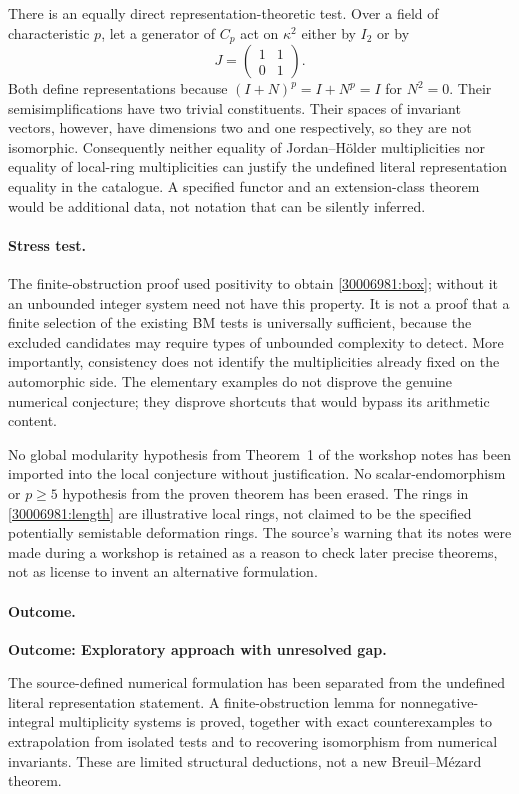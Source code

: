 \documentclass[11pt,a4paper]{article}
\numberwithin{equation}{section}
\begin{document}
There is an equally direct representation-theoretic test. Over a field
of characteristic $p$, let a generator of $C_p$ act on $\kappa^2$
either by $I_2$ or by
\[
 J=\begin{pmatrix}1&1\\0&1\end{pmatrix}.
\]
Both define representations because $(I+N)^p=I+N^p=I$ for $N^2=0$.
Their semisimplifications have two trivial constituents. Their spaces
of invariant vectors, however, have dimensions two and one respectively,
so they are not isomorphic. Consequently neither equality of
Jordan--H\"older multiplicities nor equality of local-ring multiplicities
can justify the undefined literal representation equality in the
catalogue. A specified functor and an extension-class theorem would be
additional data, not notation that can be silently inferred.

\paragraph{Stress test.}
The finite-obstruction proof used positivity to obtain
\eqref{30006981:box}; without it an unbounded integer system need not have
this property. It is not a proof that a finite selection of the existing
BM tests is universally sufficient, because the excluded candidates may
require types of unbounded complexity to detect. More importantly,
consistency does not identify the multiplicities already fixed on the
automorphic side. The elementary examples do not disprove the genuine
numerical conjecture; they disprove shortcuts that would bypass its
arithmetic content.

No global modularity hypothesis from Theorem~1 of the workshop notes
has been imported into the local conjecture without justification.
No scalar-endomorphism or $p\ge5$ hypothesis from the proven theorem
has been erased. The rings in \eqref{30006981:length} are illustrative local
rings, not claimed to be the specified potentially semistable
deformation rings. The source's warning that its notes were made during
a workshop is retained as a reason to check later precise theorems,
not as license to invent an alternative formulation.

\paragraph{Outcome.}
\textbf{Outcome: Exploratory approach with unresolved gap.}

The source-defined numerical formulation has been separated from the
undefined literal representation statement. A finite-obstruction lemma
for nonnegative-integral multiplicity systems is proved, together with
exact counterexamples to extrapolation from isolated tests and to
recovering isomorphism from numerical invariants. These are limited
structural deductions, not a new Breuil--M\'ezard theorem.
\end{document}
